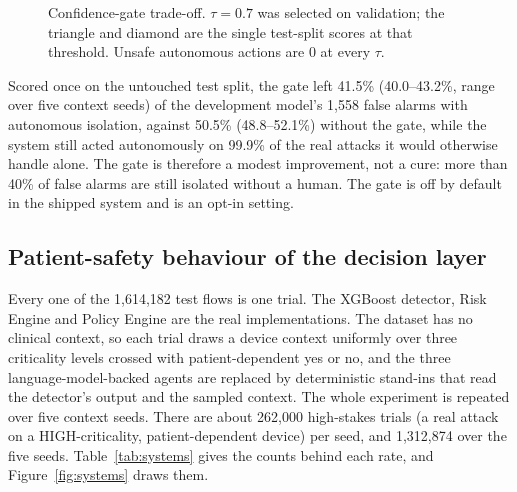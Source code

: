 \documentclass[preprint,12pt]{elsarticle}
\begin{document}
\begin{figure}[htbp]
\centering
{}
\caption{Confidence-gate trade-off. $\tau=0.7$ was selected on validation; the triangle and diamond are the single test-split scores at that threshold. Unsafe autonomous actions are 0 at every $\tau$.}
\label{fig:gate}
\end{figure}

Scored once on the untouched test split, the gate left 41.5\% (40.0--43.2\%, range over five context seeds) of the development model's 1,558 false alarms with autonomous isolation, against 50.5\% (48.8--52.1\%) without the gate, while the system still acted autonomously on 99.9\% of the real attacks it would otherwise handle alone. The gate is therefore a modest improvement, not a cure: more than 40\% of false alarms are still isolated without a human. The gate is off by default in the shipped system and is an opt-in setting.

\subsection{Patient-safety behaviour of the decision layer}
\label{sec:safety}
Every one of the 1,614,182 test flows is one trial. The XGBoost detector, Risk Engine and Policy Engine are the real implementations. The dataset has no clinical context, so each trial draws a device context uniformly over three criticality levels crossed with patient-dependent yes or no, and the three language-model-backed agents are replaced by deterministic stand-ins that read the detector's output and the sampled context. The whole experiment is repeated over five context seeds. There are about 262,000 high-stakes trials (a real attack on a HIGH-criticality, patient-dependent device) per seed, and 1,312,874 over the five seeds. Table~\ref{tab:systems} gives the counts behind each rate, and Figure~\ref{fig:systems} draws them.
\end{document}
